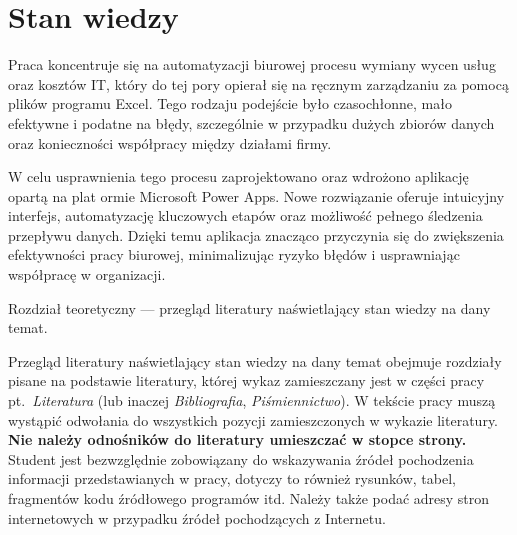 
\chapter{Stan wiedzy}

Praca koncentruje się na automatyzacji biurowej procesu wymiany wycen usług oraz kosztów IT, który do tej pory opierał się na ręcznym zarządzaniu za pomocą plików programu Excel. Tego rodzaju podejście było czasochłonne, mało efektywne i podatne na błędy, szczególnie w przypadku dużych zbiorów danych oraz konieczności współpracy między działami firmy.

W celu usprawnienia tego procesu zaprojektowano oraz wdrożono aplikację opartą na plat ormie Microsoft Power Apps. Nowe rozwiązanie oferuje intuicyjny interfejs, automatyzację kluczowych etapów oraz możliwość pełnego śledzenia przepływu danych. Dzięki temu aplikacja znacząco przyczynia się do zwiększenia efektywności pracy biurowej, minimalizując ryzyko błędów i usprawniając współpracę w organizacji.



Rozdział teoretyczny --- przegląd literatury naświetlający stan wiedzy na dany temat. 

Przegląd literatury naświetlający stan wiedzy na dany temat obejmuje rozdziały pisane na podstawie
literatury, której wykaz zamieszczany jest w części pracy pt.~\emph{Literatura} (lub inaczej \emph{Bibliografia},
\emph{Piśmiennictwo}). W tekście pracy muszą wystąpić odwołania do wszystkich pozycji zamieszczonych w
wykazie literatury. \textbf{Nie należy odnośników do literatury umieszczać w stopce strony.} Student jest
bezwzględnie zobowiązany do wskazywania źródeł pochodzenia informacji przedstawianych w pracy,
dotyczy to również rysunków, tabel, fragmentów kodu źródłowego programów itd. Należy także podać
adresy stron internetowych w przypadku źródeł pochodzących z Internetu.


